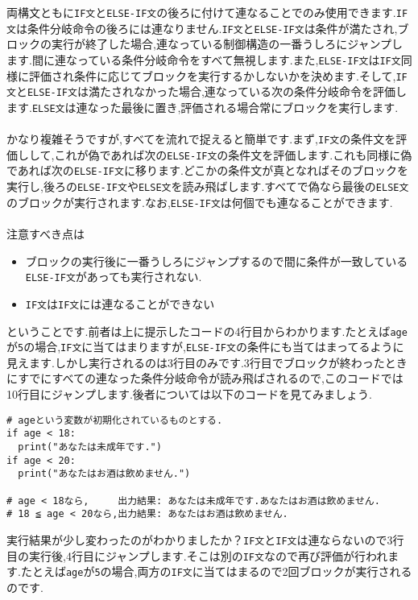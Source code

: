 \documentclass[a4paper]{ltjsreport}
\newcommand{\terlogy}[2][|]{\colorbox{terlogy}{\texttt{\lstinline#1#2#1}}}
\begin{document}
両構文ともに\terlogy{IF文}と\terlogy{ELSE-IF文}の後ろに付けて連なることでのみ使用できます.\terlogy{IF文}は条件分岐命令の後ろには連なりません.\terlogy{IF文}と\terlogy{ELSE-IF文}は条件が満たされ,ブロックの実行が終了した場合,連なっている制御構造の一番うしろにジャンプします.間に連なっている条件分岐命令をすべて無視します.また,\terlogy{ELSE-IF文}は\terlogy{IF文}同様に評価され条件に応じてブロックを実行するかしないかを決めます.そして,\terlogy{IF文}と\terlogy{ELSE-IF文}は満たされなかった場合,連なっている次の条件分岐命令を評価します.\terlogy{ELSE文}は連なった最後に置き,評価される場合常にブロックを実行します.
\\\\
かなり複雑そうですが,すべてを流れで捉えると簡単です.まず,\terlogy{IF文}の条件文を評価しして,これが偽であれば次の\terlogy{ELSE-IF文}の条件文を評価します.これも同様に偽であれば次の\terlogy{ELSE-IF文}に移ります.どこかの条件文が真となればそのブロックを実行し,後ろの\terlogy{ELSE-IF文}や\terlogy{ELSE文}を読み飛ばします.すべてで偽なら最後の\terlogy{ELSE文}のブロックが実行されます.なお,\terlogy{ELSE-IF文}は何個でも連なることができます.
\\\\
注意すべき点は

\begin{itemize}
  \item ブロックの実行後に一番うしろにジャンプするので間に条件が一致している\terlogy{ELSE-IF文}があっても実行されない.
  \item \terlogy{IF文}は\terlogy{IF文}には連なることができない
\end{itemize}

ということです.前者は上に提示したコードの4行目からわかります.たとえば\terlogy{age}が\terlogy{5}の場合,\terlogy{IF文}に当てはまりますが,\terlogy{ELSE-IF文}の条件にも当てはまってるように見えます.しかし実行されるのは3行目のみです.3行目でブロックが終わったときにすでにすべての連なった条件分岐命令が読み飛ばされるので,このコードでは10行目にジャンプします.後者については以下のコードを見てみましょう.

\begin{zenn}
  \begin{lstlisting}[language=mypy]
# ageという変数が初期化されているものとする.
if age < 18:
  print("あなたは未成年です.")
if age < 20:
  print("あなたはお酒は飲めません.")

# age < 18なら,     出力結果: あなたは未成年です.あなたはお酒は飲めません.
# 18 ≦ age < 20なら,出力結果: あなたはお酒は飲めません.
\end{lstlisting}
\end{zenn}

実行結果が少し変わったのがわかりましたか？\terlogy{IF文}と\terlogy{IF文}は連ならないので3行目の実行後,4行目にジャンプします.そこは別の\terlogy{IF文}なので再び評価が行われます.たとえば\terlogy{age}が\terlogy{5}の場合,両方の\terlogy{IF文}に当てはまるので2回ブロックが実行されるのです.
\end{document}
